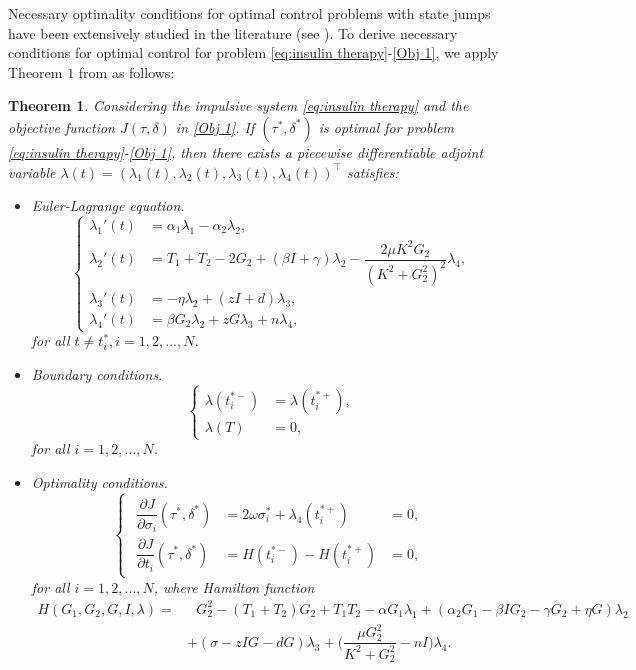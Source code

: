 \documentclass[a4paper,fleqn]{cas-sc}
\numberwithin{equation}{section}
\numberwithin{equation}{section}
\newcommand{\1}{\boldsymbol{1}}
\newcommand{\0}{\boldsymbol{0}}
\newtheorem{theorem}{Theorem}[section]
\begin{document}
Necessary optimality conditions for optimal control problems with state jumps have been extensively studied in the literature (see \cite{hu2005optimization,liu2023impulsive,liu1998statejumps}). To derive necessary conditions for optimal control for problem \eqref{eq:insulin therapy}-\eqref{Obj 1}, we apply Theorem $1$ from \cite{liu2023impulsive} as follows: 
\begin{theorem}
    Considering the impulsive system \eqref{eq:insulin therapy} and the objective function $J(\tau,\delta)$ in \eqref{Obj 1}. If $(\tau^*,\delta^*)$ is optimal for problem \eqref{eq:insulin therapy}-\eqref{Obj 1}, then there exists a piecewise differentiable adjoint variable  $\lambda(t) = (\lambda_1(t),\lambda_2(t),\lambda_3(t),\lambda_4(t))^\top$ satisfies:
    \begin{itemize}
        \item Euler-Lagrange equation. 
        \[
        \begin{cases}
            \lambda_1'(t) &= \alpha_1\lambda_1 - \alpha_2\lambda_2, \\
            \lambda_2'(t) &= T_1+T_2-2G_2 + (\beta I + \gamma)\lambda_2 - \dfrac{2\mu K^2G_2}{(K^2+G_2^2)^2}\lambda_4, \\
            \lambda_3'(t) &= -\eta\lambda_2 + (zI+d)\lambda_3, \\
            \lambda_4'(t) &= \beta G_2\lambda_2 + zG\lambda_3 + n\lambda_4,
        \end{cases}
        \]
        for all $t \neq t_i^*, i = 1,2,...,N$.
        \item Boundary conditions.
        \[
        \begin{cases}
            \lambda(t_i^{*-}) &= \lambda(t_i^{*+}), \\
            \lambda(T) &= 0,
        \end{cases}
        \]
        for all $i = 1,2,...,N$.
        \item Optimality conditions.
        \[
        \begin{cases}
        \begin{aligned}
            \dfrac{\partial J}{\partial \sigma_i}(\tau^*,\delta^*) &= 2\omega\sigma_i^* + \lambda_4(t_i^{*+}) &= 0, \\
            \dfrac{\partial J}{\partial t_i}(\tau^*, \delta^*) &= H(t_i^{*-}) - H(t_i^{*+}) &= 0,
        \end{aligned}
        \end{cases}
        \]
        for all $i = 1,2,...,N$, where Hamilton function 
        \begin{align*}
            H(G_1,G_2,G,I,\lambda) = &\text{ }G_2^2 - (T_1 + T_2)G_2 + T_1T_2 - \alpha G_1\lambda_1 + (\alpha_2G_1-\beta I G_2 - \gamma G_2 + \eta G)\lambda_2 \\
            &+ (\sigma - zIG -dG)\lambda_3 + \bigg(\dfrac{\mu G_2^2}{K^2 + G_2^2} - nI\bigg)\lambda_4.
        \end{align*}
    \end{itemize}
\end{theorem}
\end{document}
